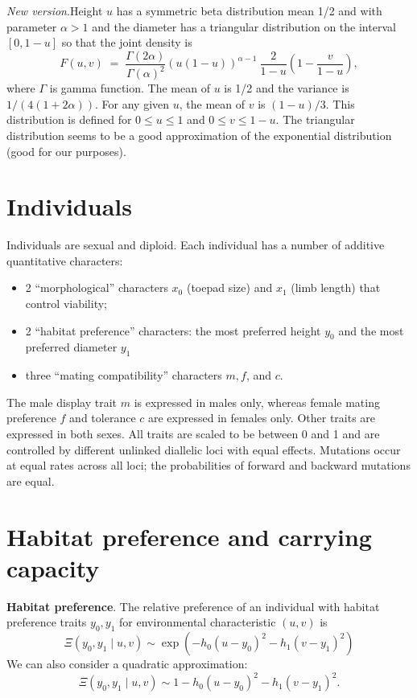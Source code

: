 \documentclass{article}
\begin{document}
{\em New version}.\quad Height $u$ has a symmetric beta distribution mean 1/2
and with parameter
$\alpha>1$ and the diameter has a triangular distribution on the interval $[0,1-u]$
so that the joint density is 
\begin{equation} \label{beta}
F(u,v) \; = \;
\frac{\Gamma(2\alpha)}{\Gamma(\alpha)^2} (u(1-u))^{\alpha-1}\ \frac{2}{1-u}(1-\frac{v}{1-u}),
\end{equation}
where $\Gamma$ is gamma function. The mean of $u$ is 1/2 and the variance is $1/(4(1+2\alpha))$.
For any given $u$, the mean of $v$ is $(1-u)/3$.
This distribution is defined for $0 \leq u \leq 1$ and $0 \leq v \leq 1-u$.
The triangular distribution seems to be a good approximation of the exponential
distribution (good for our purposes).

\section{Individuals}

Individuals are sexual and diploid. Each individual has a number of
additive quantitative characters:
\begin{itemize}
\item 2 ``morphological'' characters $x_0$ (toepad size) and $x_1$
  (limb length) that control viability;
\item 2 ``habitat preference'' characters: the most preferred height
  $y_0$ and the most preferred diameter $y_1$
\item three ``mating compatibility'' characters $m, f$, and $c$.
\end{itemize}

The male display trait $m$ is expressed in males only, whereas female
mating preference $f$ and tolerance $c$ are expressed in females
only. Other traits are expressed in both sexes.  All traits are scaled
to be between 0 and 1 and are controlled by different unlinked
diallelic loci with equal effects. Mutations occur at equal rates
across all loci; the probabilities of forward and backward mutations
are equal.


\newpage
\section{Habitat preference and carrying capacity}

{\bf Habitat preference}.\quad
The relative preference of an individual with habitat preference
traits $y_0,y_1$ for environmental characteristic $(u,v)$ is 
	\begin{equation}
	\Xi(y_0,y_1\mid u,v) \sim \exp(-h_0(u-y_0)^2-h_1(v-y_1)^2)
	\end{equation}
We can also consider a quadratic approximation:
	\begin{equation} \label{quad}
	\Xi(y_0,y_1\mid u,v) \sim 1-h_0(u-y_0)^2-h_1(v-y_1)^2.
	\end{equation}
\end{document}
